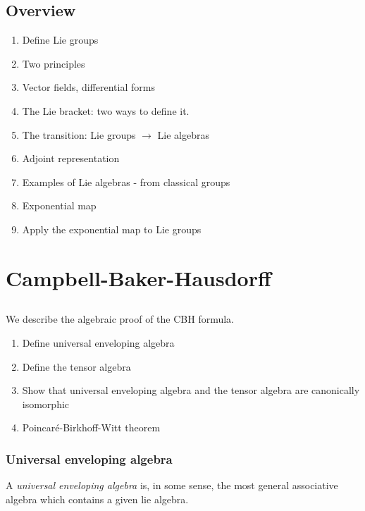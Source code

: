 \section{Overview}
\label{sec:overview}

\begin{enumerate}
    \makethislistcompact
    \item Define Lie groups
    \item Two principles
    \item Vector fields, differential forms
    \item The Lie bracket: two ways to define it.
    \item The transition: Lie groups $\to$  Lie algebras
    \item Adjoint representation
    \item Examples of Lie algebras - from classical groups
    \item Exponential map
    \item Apply the exponential map to Lie groups
\end{enumerate}




\chapter{Campbell-Baker-Hausdorff}
\section{}
We describe the algebraic proof of the CBH formula. 

\begin{enumerate}
    \makethislistcompact
    \item Define universal enveloping algebra
    \item Define the tensor algebra
    \item Show that universal enveloping algebra and the tensor algebra are canonically isomorphic
    \item Poincaré-Birkhoff-Witt theorem
\end{enumerate}

\subsection{Universal enveloping algebra}
\label{sub:universal_enveloping_algebra}

A \emph{universal enveloping algebra} is, in some sense, the most general associative algebra which contains a given lie algebra. 

